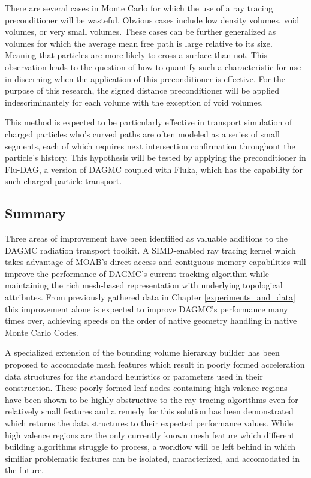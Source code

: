 \documentclass[12pt, a4paper]{article}
\begin{document}
There are several cases in Monte Carlo for which the use of a ray tracing preconditioner will be wasteful. Obvious cases include low density volumes, void volumes, or very small volumes. These cases can be further generalized as volumes for which the average mean free path is large relative to its size. Meaning that particles are more likely to cross a surface than not. This observation leads to the question of how to quantify such a characteristic for use in discerning when the application of this preconditioner is effective. For the purpose of this research, the signed distance preconditioner will be applied indescriminantely for each volume with the exception of void volumes.

This method is expected to be particularly effective in transport simulation of charged particles who's curved paths are often modeled as a series of small segments, each of which requires next intersection confirmation throughout the particle's history. This hypothesis will be tested by applying the preconditioner in Flu-DAG, a version of DAGMC coupled with Fluka\cite{Bohlen_2014}, which has the capability for such charged particle transport.

\subsection{Summary}

Three areas of improvement have been identified as valuable additions to the DAGMC radiation transport toolkit. A SIMD-enabled ray tracing kernel which takes advantage of MOAB's direct access and contiguous memory capabilities will improve the performance of DAGMC's current tracking algorithm while maintaining the rich mesh-based representation with underlying topological attributes. From previously gathered data in Chapter \ref{experiments_and_data} this improvement alone is expected to improve DAGMC's performance many times over, achieving speeds on the order of native geometry handling in native Monte Carlo Codes.

A specialized extension of the bounding volume hierarchy builder has been proposed to accomodate mesh features which result in poorly formed acceleration data structures for the standard heuristics or parameters used in their construction. These poorly formed leaf nodes containing high valence regions have been shown to be highly obstructive to the ray tracing algorithms even for relatively small features and a remedy for this solution has been demonstrated which returns the data structures to their expected performance values. While high valence regions are the only currently known mesh feature which different building algorithms struggle to process, a workflow will be left behind in which similiar problematic features can be isolated, characterized, and accomodated in the future.
\end{document}
